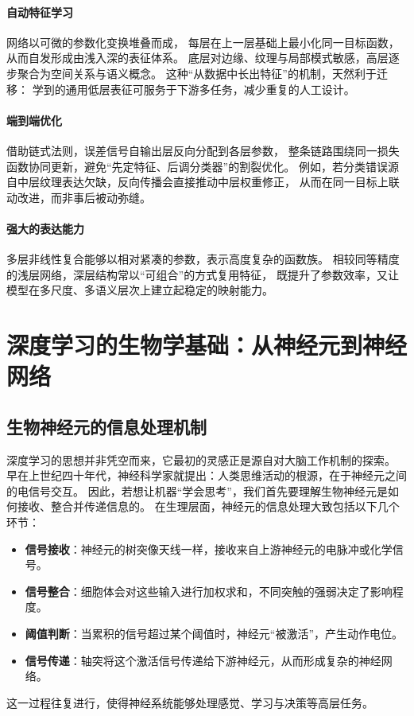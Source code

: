 \paragraph{自动特征学习}
网络以可微的参数化变换堆叠而成，  
每层在上一层基础上最小化同一目标函数，从而自发形成由浅入深的表征体系。  
底层对边缘、纹理与局部模式敏感，高层逐步聚合为空间关系与语义概念。  
这种“从数据中长出特征”的机制，天然利于迁移：  
学到的通用低层表征可服务于下游多任务，减少重复的人工设计。

\paragraph{端到端优化}
借助链式法则，误差信号自输出层反向分配到各层参数，  
整条链路围绕同一损失函数协同更新，避免“先定特征、后调分类器”的割裂优化。  
例如，若分类错误源自中层纹理表达欠缺，反向传播会直接推动中层权重修正，  
从而在同一目标上联动改进，而非事后被动弥缝。

\paragraph{强大的表达能力}
多层非线性复合能够以相对紧凑的参数，表示高度复杂的函数族。  
相较同等精度的浅层网络，深层结构常以“可组合”的方式复用特征，  
既提升了参数效率，又让模型在多尺度、多语义层次上建立起稳定的映射能力。

\section{深度学习的生物学基础：从神经元到神经网络}

\subsection{生物神经元的信息处理机制}

深度学习的思想并非凭空而来，它最初的灵感正是源自对大脑工作机制的探索。  
早在上世纪四十年代，神经科学家就提出：人类思维活动的根源，在于神经元之间的电信号交互。  
因此，若想让机器“学会思考”，我们首先要理解生物神经元是如何接收、整合并传递信息的。  
在生理层面，神经元的信息处理大致包括以下几个环节：

\begin{itemize}
\item {\bf 信号接收}：神经元的树突像天线一样，接收来自上游神经元的电脉冲或化学信号。
\item {\bf 信号整合}：细胞体会对这些输入进行加权求和，不同突触的强弱决定了影响程度。
\item {\bf 阈值判断}：当累积的信号超过某个阈值时，神经元“被激活”，产生动作电位。
\item {\bf 信号传递}：轴突将这个激活信号传递给下游神经元，从而形成复杂的神经网络。
\end{itemize}
这一过程往复进行，使得神经系统能够处理感觉、学习与决策等高层任务。

